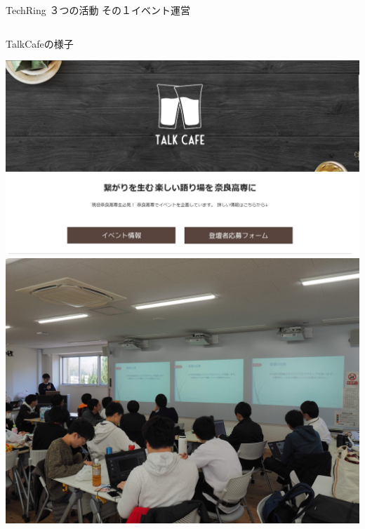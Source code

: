 \documentclass[dvipdfmx]{beamer}
\begin{document}
\begin{frame}{TechRing ３つの活動 その１}{イベント運営}
\begin{columns}[totalwidth=\textwidth]
    \begin{column}{0.4\textwidth}
      \begin{greyblock}{TalkCafeの様子}
        \begin{center}
          \includegraphics[scale=.12]{pic/TalkCafeHP.jpg}\\
          \vspace{2mm}
          \includegraphics[scale=.025]{pic/TalkCafe.jpg}
        \end{center}
      \end{greyblock}
    \end{column}
  \end{columns}
\end{frame}
\end{document}
